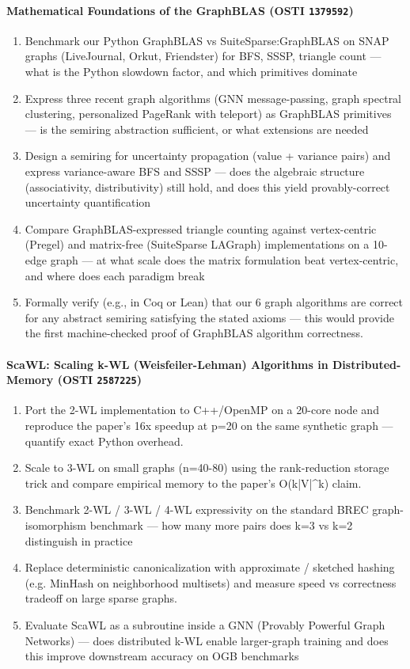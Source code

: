 \paragraph{Mathematical Foundations of the GraphBLAS \textnormal{\small(OSTI \texttt{1379592})}}
\begin{enumerate}[leftmargin=1.6em,itemsep=0.2em,topsep=0.2em,label=Q\arabic*.]
\item Benchmark our Python GraphBLAS vs SuiteSparse:GraphBLAS on SNAP graphs (LiveJournal, Orkut, Friendster) for BFS, SSSP, triangle count --- what is the Python slowdown factor, and which primitives dominate
\item Express three recent graph algorithms (GNN message-passing, graph spectral clustering, personalized PageRank with teleport) as GraphBLAS primitives --- is the semiring abstraction sufficient, or what extensions are needed
\item Design a semiring for uncertainty propagation (value + variance pairs) and express variance-aware BFS and SSSP --- does the algebraic structure (associativity, distributivity) still hold, and does this yield provably-correct uncertainty quantification
\item Compare GraphBLAS-expressed triangle counting against vertex-centric (Pregel) and matrix-free (SuiteSparse LAGraph) implementations on a 10-edge graph --- at what scale does the matrix formulation beat vertex-centric, and where does each paradigm break
\item Formally verify (e.g., in Coq or Lean) that our 6 graph algorithms are correct for any abstract semiring satisfying the stated axioms --- this would provide the first machine-checked proof of GraphBLAS algorithm correctness.
\end{enumerate}
\paragraph{ScaWL: Scaling k-WL (Weisfeiler-Lehman) Algorithms in Distributed-Memory \textnormal{\small(OSTI \texttt{2587225})}}
\begin{enumerate}[leftmargin=1.6em,itemsep=0.2em,topsep=0.2em,label=Q\arabic*.]
\item Port the 2-WL implementation to C++/OpenMP on a 20-core node and reproduce the paper's 16x speedup at p=20 on the same synthetic graph --- quantify exact Python overhead.
\item Scale to 3-WL on small graphs (n=40-80) using the rank-reduction storage trick and compare empirical memory to the paper's O(k|V|\textasciicircum{}k) claim.
\item Benchmark 2-WL / 3-WL / 4-WL expressivity on the standard BREC graph-isomorphism benchmark --- how many more pairs does k=3 vs k=2 distinguish in practice
\item Replace deterministic canonicalization with approximate / sketched hashing (e.g. MinHash on neighborhood multisets) and measure speed vs correctness tradeoff on large sparse graphs.
\item Evaluate ScaWL as a subroutine inside a GNN (Provably Powerful Graph Networks) --- does distributed k-WL enable larger-graph training and does this improve downstream accuracy on OGB benchmarks
\end{enumerate}
